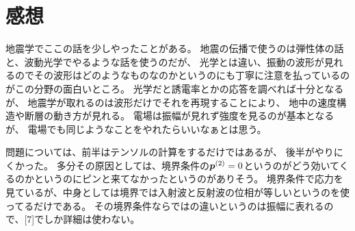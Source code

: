 \documentclass[../ap_2021.tex]{subfiles}
\begin{document}
\section*{感想}
地震学でここの話を少しやったことがある。
地震の伝播で使うのは弾性体の話と、波動光学でやるような話を使うのだが、
光学とは違い、振動の波形が見れるのでその波形はどのようなものなのかというのにも丁寧に注意を払っているのがこの分野の面白いところ。
光学だと誘電率とかの応答を調べれば十分となるが、
地震学が取れるのは波形だけでそれを再現することにより、
地中の速度構造や断層の動き方が見れる。
電場は振幅が見れず強度を見るのが基本となるが、
電場でも同じようなことをやれたらいいなぁとは思う。

問題については、前半はテンソルの計算をするだけではあるが、
後半がやりにくかった。
多分その原因としては、境界条件の\(\vb*{p}^{(2)}=0\)というのがどう効いてくるのかというのにピンと来てなかったというのがありそう。
境界条件で応力を見ているが、中身としては境界では入射波と反射波の位相が等しいというのを使ってるだけである。
その境界条件ならではの違いというのは振幅に表れるので、[7]でしか詳細は使わない。
\end{document}
